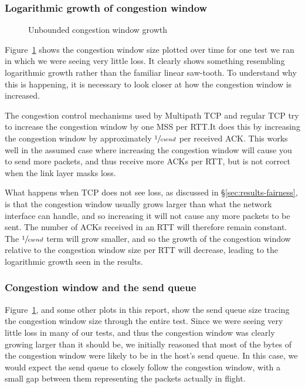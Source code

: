 \subsubsection{Logarithmic growth of congestion window}

\begin{figure}[h]
 \centering
 
 \caption{Unbounded congestion window growth}\label{graph:logarithmic}
\end{figure}

Figure~\ref{graph:logarithmic} shows the congestion window size plotted over
time for one test we ran in which we were seeing very little loss. It clearly
shows something resembling logarithmic growth rather than the familiar linear
saw-tooth. To understand why this is happening, it is necessary to look closer
at how the congestion window is increased.

The congestion control mechanisms used by Multipath TCP and regular TCP try to
increase the congestion window by one MSS per RTT.\@ It does this by increasing
the congestion window by approximately $\sfrac{1}{cwnd}$ per received ACK.\@
This works well in the assumed case where increasing the congestion window will
cause you to send more packets, and thus receive more ACKs per RTT, but is not
correct when the link layer masks loss.

What happens when TCP does not see loss, as discussed in 
\S\ref{sec:results-fairness}, is %
that the congestion window usually grows larger than what the network interface 
can handle, and so increasing it will not cause any more packets to be sent. 
The number of ACKs received in an RTT will therefore remain constant. The 
$\sfrac{1}{cwnd}$ term will grow smaller, and so the growth of the congestion 
window relative to the congestion window size per RTT will decrease, leading to 
the logarithmic growth seen in the results.

\subsubsection{Congestion window and the send queue}
Figure~\ref{graph:logarithmic}, and some other plots in this report, show the
send queue size tracing the congestion window size through the entire test.
Since we were seeing very little loss in many of our tests, and thus the
congestion window was clearly growing larger than it should be, we initially
reasoned that most of the bytes of the congestion window were likely to be in
the host's send queue. In this case, we would expect the send queue to closely
follow the congestion window, with a small gap between them representing the
packets actually in flight.

